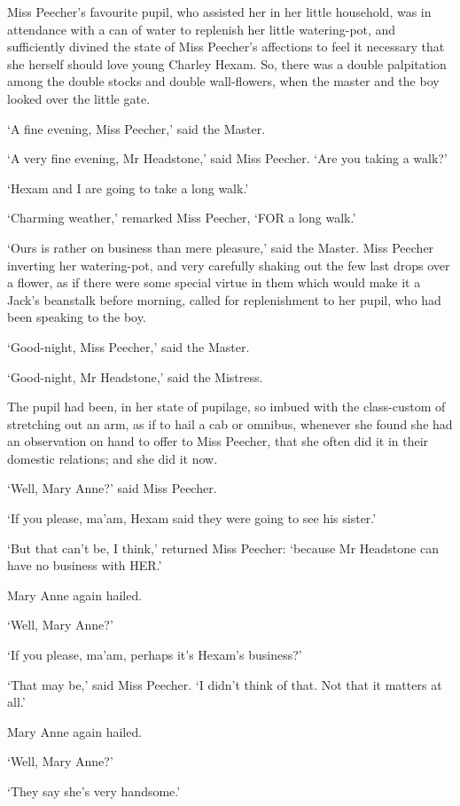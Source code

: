 Miss Peecher’s favourite pupil, who assisted her in her little
household, was in attendance with a can of water to replenish her little
watering-pot, and sufficiently divined the state of Miss Peecher’s
affections to feel it necessary that she herself should love young
Charley Hexam. So, there was a double palpitation among the double
stocks and double wall-flowers, when the master and the boy looked over
the little gate.

‘A fine evening, Miss Peecher,’ said the Master.

‘A very fine evening, Mr Headstone,’ said Miss Peecher. ‘Are you taking
a walk?’

‘Hexam and I are going to take a long walk.’

‘Charming weather,’ remarked Miss Peecher, ‘FOR a long walk.’

‘Ours is rather on business than mere pleasure,’ said the Master. Miss
Peecher inverting her watering-pot, and very carefully shaking out the
few last drops over a flower, as if there were some special virtue in
them which would make it a Jack’s beanstalk before morning, called for
replenishment to her pupil, who had been speaking to the boy.

‘Good-night, Miss Peecher,’ said the Master.

‘Good-night, Mr Headstone,’ said the Mistress.

The pupil had been, in her state of pupilage, so imbued with the
class-custom of stretching out an arm, as if to hail a cab or omnibus,
whenever she found she had an observation on hand to offer to Miss
Peecher, that she often did it in their domestic relations; and she did
it now.

‘Well, Mary Anne?’ said Miss Peecher.

‘If you please, ma’am, Hexam said they were going to see his sister.’

‘But that can’t be, I think,’ returned Miss Peecher: ‘because Mr
Headstone can have no business with HER.’

Mary Anne again hailed.

‘Well, Mary Anne?’

‘If you please, ma’am, perhaps it’s Hexam’s business?’

‘That may be,’ said Miss Peecher. ‘I didn’t think of that. Not that it
matters at all.’

Mary Anne again hailed.

‘Well, Mary Anne?’

‘They say she’s very handsome.’

